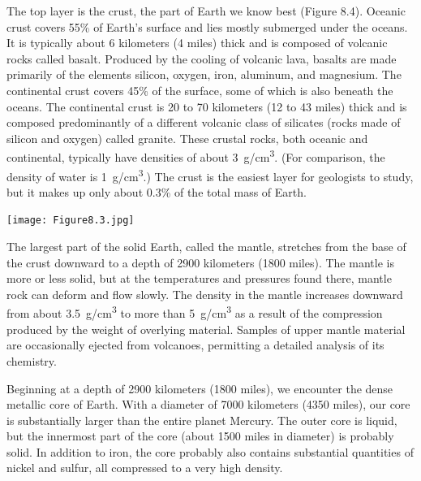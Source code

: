 \documentclass{article}
\numberwithin{equation}{section}
\numberwithin{figure}{section}
\begin{document}
\begin{minipage}{0.45\textwidth}
    The top layer is the \gls{crust}, the part of Earth we know best (Figure 8.4). Oceanic crust covers 55\% of Earth's surface and lies mostly submerged under the oceans. It is typically about 6 kilometers (4 miles) thick and is composed of volcanic rocks called \gls{basalt}. Produced by the cooling of volcanic lava, basalts are made primarily of the elements silicon, oxygen, iron, aluminum, and magnesium. The continental crust covers 45\% of the surface, some of which is also beneath the oceans. The continental crust is 20 to 70 kilometers (12 to 43 miles) thick and is composed predominantly of a different volcanic class of silicates (rocks made of silicon and oxygen) called \gls{granite}. These crustal rocks, both oceanic and continental, typically have densities of about \SI{3}{g/cm^3}. (For comparison, the density of water is \SI{1}{g/cm^3}.) The crust is the easiest layer for geologists to study, but it makes up only about 0.3\% of the total mass of Earth.
\end{minipage}%
\hspace{5mm}
\begin{minipage}{0.45\textwidth}
    \texttt{[image: Figure8.3.jpg]}
\end{minipage}

\vspace{1em}

The largest part of the solid Earth, called the \gls{mantle}, stretches from the base of the crust downward to a depth of 2900 kilometers (1800 miles). The mantle is more or less solid, but at the temperatures and pressures found there, mantle rock can deform and flow slowly. The density in the mantle increases downward from about \SI{3.5}{g/cm^3} to more than \SI{5}{g/cm^3} as a result of the compression produced by the weight of overlying material. Samples of upper mantle material are occasionally ejected from \gls{volcano}es, permitting a detailed analysis of its chemistry.

\vspace{1em}

Beginning at a depth of 2900 kilometers (1800 miles), we encounter the dense metallic \gls{core} of Earth. With a diameter of 7000 kilometers (4350 miles), our core is substantially larger than the entire planet Mercury. The outer core is liquid, but the innermost part of the core (about 1500 miles in diameter) is probably solid. In addition to iron, the core probably also contains substantial quantities of nickel and sulfur, all compressed to a very high density.
\end{document}
